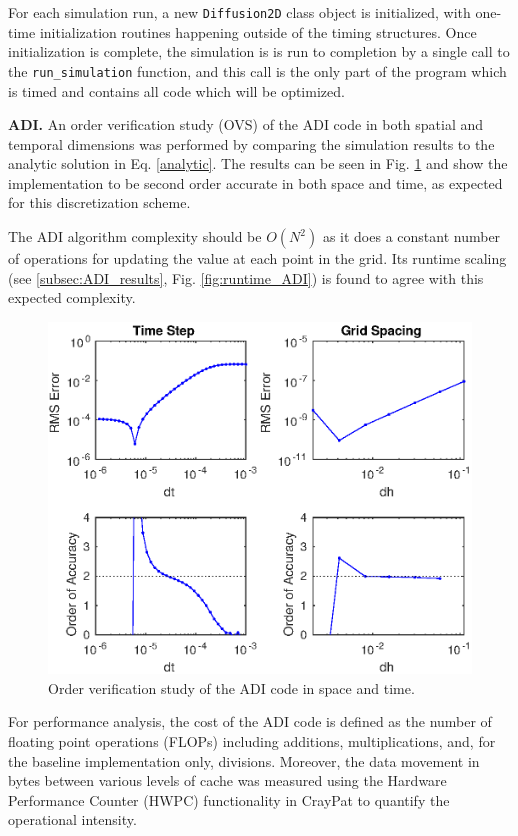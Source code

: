 \documentclass[letterpaper]{article}
\newcommand{\mypar}[1]{{\bf #1.}}
\begin{document}
For each simulation run, a new {\tt Diffusion2D} class object is initialized, with one-time initialization routines happening outside of the timing structures. Once initialization is complete, the simulation is is run to completion by a single call to the {\tt run\_simulation} function, and this call is the only part of the program which is timed and contains all code which will be optimized. 

\mypar{ADI}
An order verification study (OVS) of the ADI code in both spatial and temporal dimensions was performed by comparing the simulation results to the analytic solution in Eq. \eqref{analytic}. The results can be seen in Fig. \ref{fig:OVS_ADI} and show the implementation to be second order accurate in both space and time, as expected for this discretization scheme.

The ADI algorithm complexity should be $O(N^2)$ as it does a constant number of operations for updating the value at each point in the grid. Its runtime scaling (see \ref{subsec:ADI_results}, Fig. \ref{fig:runtime_ADI}) is found to agree with this expected complexity.

\begin{figure}\centering
  \includegraphics[width=\linewidth]{./plots/OVS_ADI.eps}
  \caption{Order verification study of the ADI code in space and time.}
  \label{fig:OVS_ADI}
\end{figure}

For performance analysis, the cost of the ADI code is defined as the number of floating point operations (FLOPs) including additions, multiplications, and, for the baseline implementation only, divisions. Moreover, the data movement in bytes between various levels of cache was measured using the Hardware Performance Counter (HWPC) functionality in CrayPat to quantify the operational intensity.
\end{document}
